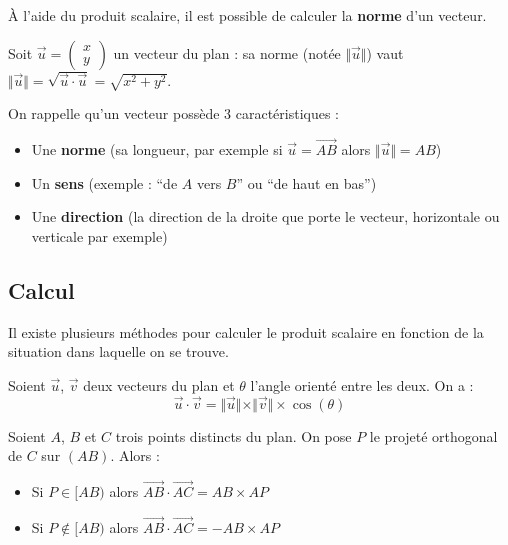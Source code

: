 	À l'aide du produit scalaire, il est possible de calculer la \textbf{norme} d'un vecteur.

	\begin{formula}
		Soit $\overrightarrow{u} = \begin{pmatrix} {x} \\ {y} \end{pmatrix}$ un vecteur du plan : sa norme (notée $\Vert \overrightarrow{u} \Vert$) vaut $\Vert \overrightarrow{u} \Vert = \sqrt{\overrightarrow{u} \cdot \overrightarrow{u}} = \sqrt{x^2 + y^2}$.
	\end{formula}

	\begin{tip}
		On rappelle qu'un vecteur possède 3 caractéristiques :
		\begin{itemize}
			\item Une \textbf{norme} (sa longueur, par exemple si $\overrightarrow{u} = \overrightarrow{AB}$ alors $\Vert \overrightarrow{u} \Vert = AB$)
			\item Un \textbf{sens} (exemple : ``de $A$ vers $B$'' ou ``de haut en bas'')
			\item Une \textbf{direction} (la direction de la droite que porte le vecteur, horizontale ou verticale par exemple)
		\end{itemize}
	\end{tip}

	\subsection{Calcul}

	Il existe plusieurs méthodes pour calculer le produit scalaire en fonction de la situation dans laquelle on se trouve.

	\begin{formula}
		Soient $\overrightarrow{u}$, $\overrightarrow{v}$ deux vecteurs du plan et $\theta$ l'angle orienté entre les deux. On a :
		\[ \overrightarrow{u} \cdot \overrightarrow{v} = \Vert \overrightarrow{u} \Vert \times \Vert \overrightarrow{v} \Vert \times \cos(\theta) \]
	\end{formula}

	\begin{formula}
		Soient $A$, $B$ et $C$ trois points distincts du plan. On pose $P$ le projeté orthogonal de $C$ sur $(AB)$. Alors :
		\begin{itemize}
			\item Si $P \in [AB)$ alors $\overrightarrow{AB} \cdot \overrightarrow{AC} = AB \times AP$
			\item Si $P \notin [AB)$ alors $\overrightarrow{AB} \cdot \overrightarrow{AC} = - AB \times AP$
		\end{itemize}
	\end{formula}

